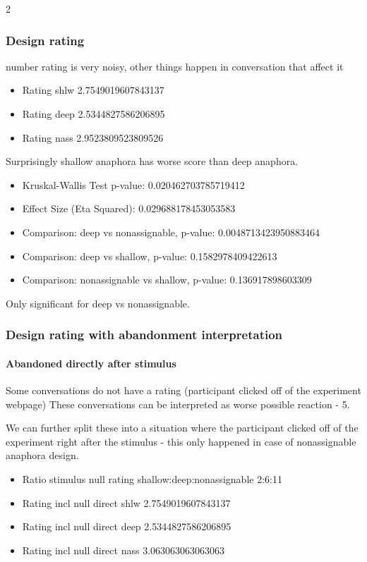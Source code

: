 2
\subsubsection{Design rating}
number rating is very noisy, other things happen in conversation that affect it

\begin{itemize}
\item Rating shlw 2.7549019607843137
\item Rating deep 2.5344827586206895
\item Rating nass 2.9523809523809526
\end{itemize}

Surprisingly shallow anaphora has worse score than deep anaphora.

\begin{itemize}
\item Kruskal-Wallis Test p-value: 0.020462703785719412
\item Effect Size (Eta Squared): 0.029688178453053583
\item Comparison: deep vs nonassignable, p-value: 0.0048713423950883464
\item Comparison: deep vs shallow, p-value: 0.1582978409422613
\item Comparison: nonassignable vs shallow, p-value: 0.136917898603309
\end{itemize}

Only significant for deep vs nonassignable.

\subsubsection{Design rating with abandonment interpretation}

\paragraph{Abandoned directly after stimulus}

Some conversations do not have a rating (participant clicked off of the experiment webpage)
These conversations can be interpreted as worse possible reaction - 5.

We can further split these into a situation where the participant clicked off of the experiment
right after the stimulus - this only happened in case of nonassignable anaphora design.

\begin{itemize}
\item Ratio stimulus null rating shallow:deep:nonassignable 2:6:11
\item Rating incl null direct shlw 2.7549019607843137
\item Rating incl null direct deep 2.5344827586206895
\item Rating incl null direct nass 3.063063063063063
\end{itemize}

